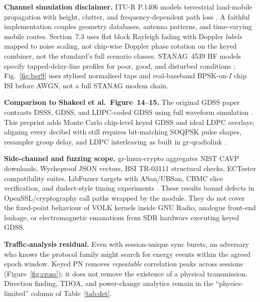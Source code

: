 \documentclass[10pt,a4paper,twocolumn]{article}
\begin{document}
\vspace{0.8em}
\noindent\textbf{Channel simulation disclaimer.} ITU-R P.1406 models terrestrial land-mobile propagation with height, clutter, and frequency-dependent path loss \cite{itu1406}. A faithful implementation couples geometry databases, antenna patterns, and time-varying mobile routes. Section~7.3 uses flat block Rayleigh fading with Doppler \emph{labels} mapped to noise scaling, not chip-wise Doppler phase rotation on the keyed combiner, not the standard's full scenario classes. STANAG~4539 HF models specify tapped-delay-line profiles for poor, good, and disturbed conditions \cite{stanag4539}; Fig.~\ref{fig:ber9} uses stylised normalised taps and real-baseband BPSK-on-$I$ chip ISI before AWGN, not a full STANAG modem chain.

\vspace{0.5em}
\noindent\textbf{Comparison to Shakeel et al.\ Figure~14--15.} The original GDSS paper contrasts DSSS, GDSS, and LDPC-coded GDSS using full waveform simulation \cite{shakeel2023}. This preprint adds Monte Carlo chip-level keyed GDSS and ideal LDPC overlays; aligning every decibel with \cite{shakeel2023} still requires bit-matching SOQPSK pulse shapes, resampler group delay, and LDPC interleaving as built in gr-qradiolink \cite{repo_qrl}.

\vspace{0.5em}
\noindent\textbf{Side-channel and fuzzing scope.} gr-linux-crypto aggregates NIST CAVP downloads, Wycheproof JSON vectors, BSI TR-03111 structural checks, ECTester compatibility suites, LibFuzzer targets with ASan/UBSan, CBMC slice verification, and dudect-style timing experiments \cite{repo_crypto_results,reparaz2017}. These results bound defects in OpenSSL/cryptography call paths wrapped by the module. They do not cover the fixed-point behaviour of VOLK kernels inside GNU Radio, analogue front-end leakage, or electromagnetic emanations from SDR hardware executing keyed GDSS.

\vspace{0.5em}
\noindent\textbf{Traffic-analysis residual.} Even with session-unique sync bursts, an adversary who knows the protocol family might search for energy events within the agreed epoch window. Keyed PN removes \emph{repeatable} correlation peaks across sessions (Figure~\ref{fig:cross}); it does not remove the existence of a physical transmission. Direction finding, TDOA, and power-change analytics remain in the ``physics-limited'' column of Table~\ref{tab:det}.
\end{document}
